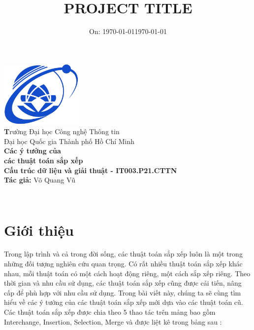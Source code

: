 \documentclass[12pt,a4paper]{report}
\title{\LARGE \textbf{PROJECT TITLE}}
\author{}
\date{\large On: \today}
\begin{document}
\makeatletter
\begin{titlepage}
    \centering
    \vspace*{1cm}
       { \includegraphics[width=4cm]{UIT.jpg}}\\[0.5cm]
    {{\textbf Trường Đại học Công nghệ Thông tin\\
    Đại học Quốc gia Thành phố Hồ Chí Minh}}\\[5cm]
    {\Huge \textbf{Các ý tưởng của \\các thuật toán sắp xếp}}\\[2cm]
    
    

    
    \textbf{Cấu trúc dữ liệu và giải thuật - IT003.P21.CTTN}{}\\[1cm]
    
    \textbf{Tác giả:}{ Võ Quang Vũ }\\[1cm]
    \date{\large \today}
    {\@date\\}
\end{titlepage}
\makeatother

{\large \tableofcontents}


\pagebreak

\chapter{ Giới thiệu}



{\large \hspace{1cm} Trong lập trình và cả trong đời sống, các thuật toán sắp xếp luôn là một trong những đối tượng nghiên cứu quan trọng. Có rất nhiều thuật toán sắp xếp khác nhau, mỗi thuật toán có một cách hoạt động riêng, một cách sắp xếp riêng. Theo thời gian và nhu cầu sử dụng, các thuật toán sắp xếp cũng được cải tiến, nâng cấp để phù hợp với nhu cầu sử dụng. Trong bài viết này, chúng ta sẽ cùng tìm hiểu về các ý tưởng của các thuật toán sắp xếp mới dựa vào các thuật toán cũ. Các thuật toán sắp xếp được chia theo 5 thao tác trên mảng bao gồm Interchange, Insertion, Selection, Merge và được liệt kê trong bảng sau :}
\end{document}
